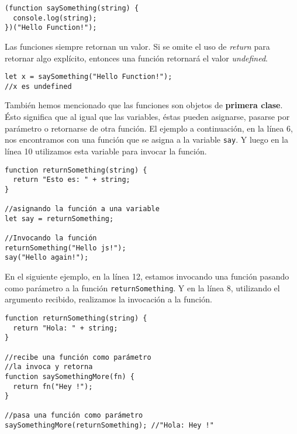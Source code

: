 \documentclass[a4paper, oneside, titlepage, 12pt]{paper}
\begin{document}
\begin{verbatim}
(function saySomething(string) {
  console.log(string);
})("Hello Function!");
\end{verbatim}

Las funciones siempre retornan un valor. Si se omite el uso de \textit{return} para retornar algo explícito, entonces una función retornará el valor \textit{undefined}.

\begin{verbatim}
let x = saySomething("Hello Function!");
//x es undefined
\end{verbatim}

También hemos mencionado que las funciones son objetos de \textbf{primera clase}. Ésto significa que al igual que las variables, éstas pueden asignarse, pasarse por parámetro o retornarse de otra función. El ejemplo a continuación, en la línea 6, nos encontramos con una función que se asigna a la variable \colorbox{verylight}{\lstinline{say}}. Y luego en la línea 10 utilizamos esta variable para invocar la función.

\begin{verbatim}
function returnSomething(string) {
  return "Esto es: " + string;
}

//asignando la función a una variable
let say = returnSomething;

//Invocando la función
returnSomething("Hello js!");
say("Hello again!");
\end{verbatim}

En el siguiente ejemplo, en la línea 12, estamos invocando una función pasando como parámetro a la función \texttt{returnSomething}. Y en la línea 8, utilizando el argumento recibido, realizamos la invocación a la función.

\begin{verbatim}
function returnSomething(string) {
  return "Hola: " + string;
}

//recibe una función como parámetro
//la invoca y retorna 
function saySomethingMore(fn) {
  return fn("Hey !");
}

//pasa una función como parámetro
saySomethingMore(returnSomething); //"Hola: Hey !"
\end{verbatim}
\end{document}
